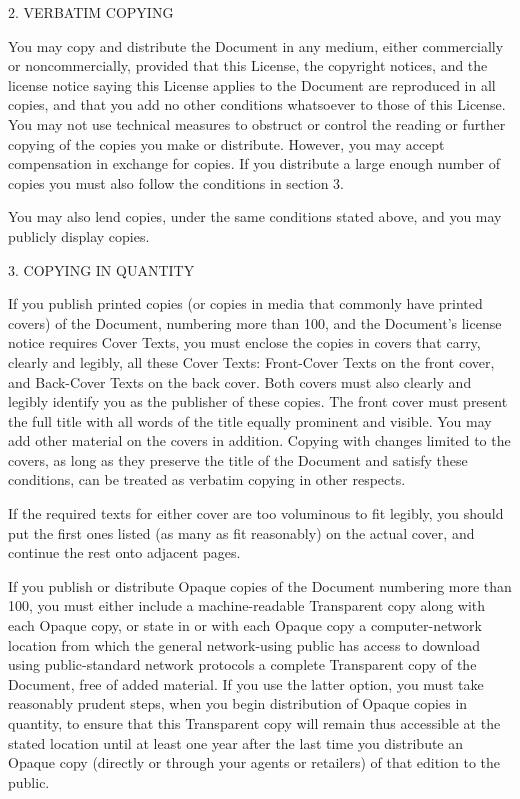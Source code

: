 2. VERBATIM COPYING

You may copy and distribute the Document in any medium, either commercially or noncommercially, provided that this
License, the copyright notices, and the license notice saying this License applies to the Document are reproduced in
all copies, and that you add no other conditions whatsoever to those of this License. You may not use technical
measures to obstruct or control the reading or further copying of the copies you make or distribute. However, you may
accept compensation in exchange for copies. If you distribute a large enough number of copies you must also follow the
conditions in section 3.

You may also lend copies, under the same conditions stated above, and you may publicly display copies.

3. COPYING IN QUANTITY

If you publish printed copies (or copies in media that commonly have printed covers) of the Document, numbering more
than 100, and the Document's license notice requires Cover Texts, you must enclose the copies in covers that carry,
clearly and legibly, all these Cover Texts: Front-Cover Texts on the front cover, and Back-Cover Texts on the back
cover. Both covers must also clearly and legibly identify you as the publisher of these copies. The front cover must
present the full title with all words of the title equally prominent and visible. You may add other material on the
covers in addition. Copying with changes limited to the covers, as long as they preserve the title of the Document and
satisfy these conditions, can be treated as verbatim copying in other respects.

If the required texts for either cover are too voluminous to fit legibly, you should put the first ones listed (as many
as fit reasonably) on the actual cover, and continue the rest onto adjacent pages.

If you publish or distribute Opaque copies of the Document numbering more than 100, you must either include a
machine-readable Transparent copy along with each Opaque copy, or state in or with each Opaque copy a computer-network
location from which the general network-using public has access to download using public-standard network protocols a
complete Transparent copy of the Document, free of added material. If you use the latter option, you must take
reasonably prudent steps, when you begin distribution of Opaque copies in quantity, to ensure that this Transparent
copy will remain thus accessible at the stated location until at least one year after the last time you distribute an
Opaque copy (directly or through your agents or retailers) of that edition to the public.

